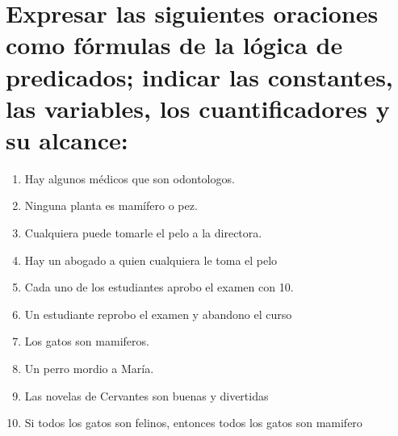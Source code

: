 \chapter*{Expresar las siguientes oraciones como fórmulas de la lógica de predicados; indicar las constantes, las variables, los cuantificadores y su alcance:}
\vspace{-20px}
\begin{multicols}{2}
	\noindent
	\begin{enumerate}[label=\alph*)]
		\item Hay algunos médicos que son odontologos.
		\item Ninguna planta es mamífero o pez.
		\item Cualquiera puede tomarle el pelo a la directora.
		\item Hay un abogado a quien cualquiera le toma el pelo
		\item Cada uno de los estudiantes aprobo el examen con 10.
		\item Un estudiante reprobo el examen y abandono el curso
		\item Los gatos son mamiferos.
		\item Un perro mordio a María.
		\item Las novelas de Cervantes son buenas y divertidas
		\item Si todos los gatos son felinos, entonces todos los gatos son mamifero
	\end{enumerate}
\end{multicols}
